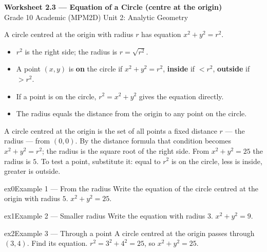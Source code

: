 \documentclass[11pt]{article}
\begin{document}
\begin{center}
{\LARGE\bfseries\color{titleblue}Worksheet 2.3 --- Equation of a Circle (centre at the origin)}\\[2pt]
{\small Grade 10 Academic (MPM2D) \textperiodcentered{} Unit 2: Analytic Geometry}
\end{center}

\begin{ideabox}
A circle centred at the origin with radius $r$ has equation $x^2+y^2=r^2$.
\begin{itemize}[leftmargin=*,itemsep=2pt]
  \item $r^2$ is the right side; the radius is $r=\sqrt{r^2}$.
  \item A point $(x,y)$ is \textbf{on} the circle if $x^2+y^2=r^2$, \textbf{inside} if $<r^2$, \textbf{outside} if $>r^2$.
  \item If a point is on the circle, $r^2=x^2+y^2$ gives the equation directly.
  \item The radius equals the distance from the origin to any point on the circle.
\end{itemize}
\end{ideabox}

\begin{learnbox}
A circle centred at the origin is the set of all points a fixed distance $r$ — the radius — from $(0,0)$.
By the distance formula that condition becomes $x^2+y^2=r^2$; the radius is the square root of the right side.
From $x^2+y^2=25$ the radius is $5$. To test a point, substitute it: equal to $r^2$ is on the circle, less is inside, greater is outside.
\end{learnbox}


\begin{example}{ex0}{Example 1 --- From the radius}
Write the equation of the circle centred at the origin with radius $5$.
\soln $x^2+y^2=25.$
\end{example}

\begin{example}{ex1}{Example 2 --- Smaller radius}
Write the equation with radius $3$.
\soln $x^2+y^2=9.$
\end{example}

\begin{example}{ex2}{Example 3 --- Through a point}
A circle centred at the origin passes through $(3,4)$. Find its equation.
\soln $r^2=3^2+4^2=25$, so $x^2+y^2=25.$
\end{example}
\end{document}
